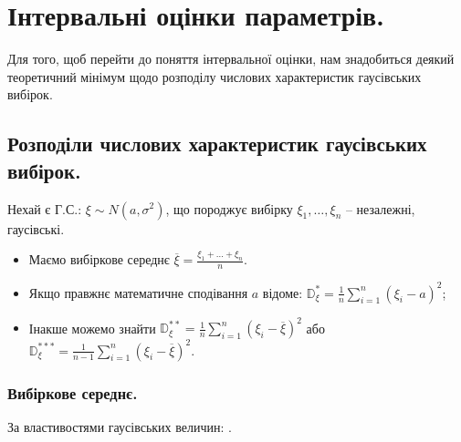 \def\dispxi#1{\mathbb{D}_\xi^{#1}}
\def\mathbox#1{\fbox{$\displaystyle #1$}}


\section{Інтервальні оцінки параметрів.}
Для того, щоб перейти до поняття інтервальної оцінки, нам знадобиться деякий теоретичний мінімум щодо розподілу числових характеристик гаусівських вибірок.
\subsection{Розподіли числових характеристик гаусівських вибірок.}
Нехай є Г.С.: $\xi \sim N(a, \sigma^2)$, що породжує вибірку $\xi_1, \dots , \xi_n$ --  незалежні, гаусівські.
\begin{itemize}
 \item Маємо  вибіркове середнє $\overline{\xi} = \frac{\xi_1 + \dots + \xi_n}{n} $.
  \item  Якщо правжнє математичне сподівання $a$ відоме: $ \mathbb{D}^*_\xi = \frac{1}{n}  \sum\limits_{i = 1}^{n}{(\xi_i - a)^2} $;
  \item Інакше можемо знайти $\mathbb{D}^{**}_\xi = \frac{1}{n}  \sum\limits_{i = 1}^{n}{(\xi_i - \overline{\xi})^2}$ або $\mathbb{D}^{***}_\xi = \frac{1}{n-1}  \sum\limits_{i = 1}^{n}{(\xi_i - \overline{\xi})^2}$.
\end{itemize}
\subsubsection{Вибіркове середнє.}
За властивостями гаусівських величин: \mathbox{\overline{\xi}\sim N \left( a, \dfrac{\sigma^2}{2} \right)}.
